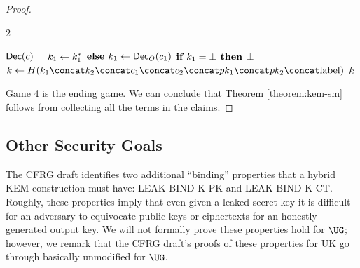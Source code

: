 \begin{proof}
\begin{itemize}
\begin{gamefigure}
\begin{games}{2}
\begin{gameenv}{\oracle $\textsf{Dec}(c)$}
                    \State $\quad k_1 \leftarrow k^*_1$
                    \State $\textbf{else } k_1 \leftarrow \textsf{Dec}_O(c_1)$
                    \State $\textbf{if } k_1 = \bot \textbf{ then}$
                    \State \quad \Return $\bot$
                    \State $k \assign H(\hashinput)$
                    \State \Return $k$
                \end{gameenv}
            \end{games}
        \end{gamefigure}
    \end{itemize}
    Game 4 is the ending game. We can conclude that Theorem
    \ref{theorem:kem-sm} follows from collecting all the terms in the claims.

\end{proof}

\subsection{Other Security Goals}
\label{sec:ug-proofs:other}

The CFRG draft identifies two additional ``binding'' properties that a hybrid
KEM construction must have: LEAK-BIND-K-PK and LEAK-BIND-K-CT. Roughly, these
properties imply that even given a leaked secret key it is difficult for an
adversary to equivocate public keys or ciphertexts for an honestly-generated
output key. We will not formally prove these properties hold for $\UG$;
however, we remark that the CFRG draft's proofs of these properties for UK
go through basically unmodified for $\UG$.
